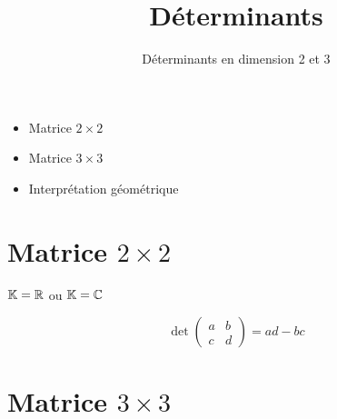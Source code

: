 

   





\title{{\bf Déterminants}}
\subtitle{Déterminants en dimension 2 et 3}

\begin{frame}
  
  \debutmontitre

  \pause

{\footnotesize
\hfill
{}
\begin{minipage}{0.6\textwidth}
  \begin{itemize}
   \item<3-> Matrice $2\times2$ 
   \item<4-> Matrice $3\times3$
   \item<5-> Interprétation géométrique
  \end{itemize}
\end{minipage}
}

\end{frame}
\setcounter{framenumber}{0}


\section{Matrice $2\times2$}

\begin{frame}

$\mathbb{K}=\mathbb{R}$ ou $\mathbb{K}=\mathbb{C}$

\pause

\bigskip




$$\det \begin{pmatrix}a&b\\c&d\end{pmatrix} = ad-bc$$


\pause 



\end{frame}


\section{Matrice $3\times3$}


